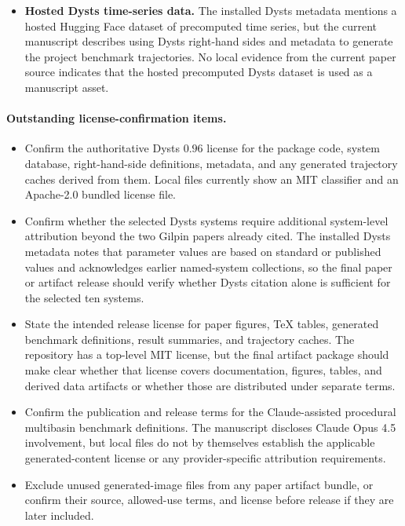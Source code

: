 \begin{itemize}
  \item \textbf{Hosted Dysts time-series data.}
  The installed Dysts metadata mentions a hosted Hugging Face dataset of
  precomputed time series, but the current manuscript describes using Dysts
  right-hand sides and metadata to generate the project benchmark trajectories.
  No local evidence from the current paper source indicates that the hosted
  precomputed Dysts dataset is used as a manuscript asset.
\end{itemize}

\paragraph{Outstanding license-confirmation items.}
\begin{itemize}
  \item Confirm the authoritative Dysts \(0.96\) license for the package code,
  system database, right-hand-side definitions, metadata, and any generated
  trajectory caches derived from them. Local files currently show an MIT
  classifier and an Apache-2.0 bundled license file.

  \item Confirm whether the selected Dysts systems require additional
  system-level attribution beyond the two Gilpin papers already cited. The
  installed Dysts metadata notes that parameter values are based on standard or
  published values and acknowledges earlier named-system collections, so the
  final paper or artifact release should verify whether Dysts citation alone is
  sufficient for the selected ten systems.

  \item State the intended release license for paper figures, TeX tables,
  generated benchmark definitions, result summaries, and trajectory caches. The
  repository has a top-level MIT license, but the final artifact package should
  make clear whether that license covers documentation, figures, tables, and
  derived data artifacts or whether those are distributed under separate terms.

  \item Confirm the publication and release terms for the Claude-assisted
  procedural multibasin benchmark definitions. The manuscript discloses Claude
  Opus 4.5 involvement, but local files do not by themselves establish the
  applicable generated-content license or any provider-specific attribution
  requirements.

  \item Exclude unused generated-image files from any paper artifact bundle, or
  confirm their source, allowed-use terms, and license before release if they
  are later included.


\end{itemize}
